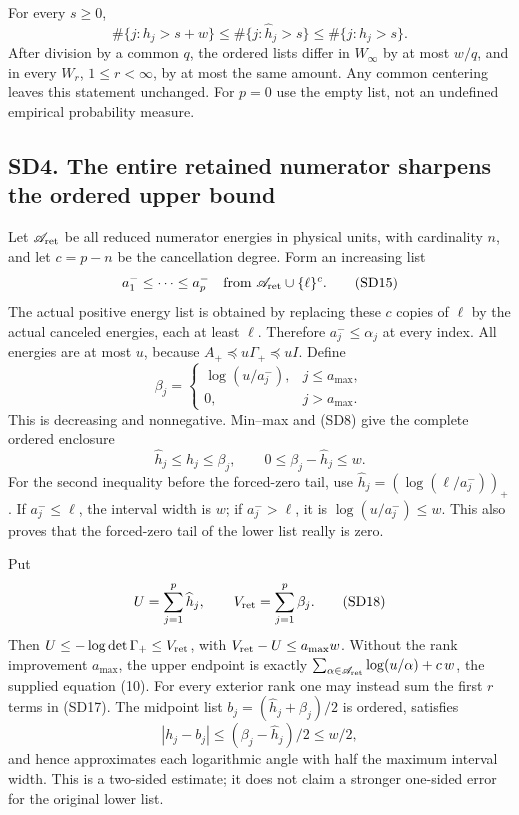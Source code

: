 \documentclass[11pt]{article}
\begin{document}
For every \(s\ge0\), \[
\#\{j:h_j>s+w\}\le\#\{j:\widehat h_j>s\}
\le\#\{j:h_j>s\}.
\tag{SD14}
\] After division by a common \(q\), the ordered lists differ in \(W_\infty\) by at most \(w/q\), and in every \(W_r\), \(1\le r<\infty\), by at most the same amount. Any common centering leaves this statement unchanged. For \(p=0\) use the empty list, not an undefined empirical probability measure.

\subsection{SD4. The entire retained numerator sharpens the ordered upper bound}\label{sd4.-the-entire-retained-numerator-sharpens-the-ordered-upper-bound}

Let \(\mathscr A_{\rm ret}\) be all reduced numerator energies in physical units, with cardinality \(n\), and let \(c=p-n\) be the cancellation degree. Form an increasing list \[
a_1^-\le\cdots\le a_p^-
\quad\text{from }\mathscr A_{\rm ret}\cup\{\ell\}^{c}.
\tag{SD15}
\] The actual positive energy list is obtained by replacing these \(c\) copies of \(\ell\) by the actual canceled energies, each at least \(\ell\). Therefore \(a_j^-\le\alpha_j\) at every index. All energies are at most \(u\), because \(A_+\preceq u\Gamma_+\preceq uI\). Define \[
\beta_j=\begin{cases}\log(u/a_j^-),&j\le a_{\max},\\0,&j>a_{\max}.\end{cases}
\tag{SD16}
\] This is decreasing and nonnegative. Min--max and (SD8) give the complete ordered enclosure \[
\widehat h_j\le h_j\le\beta_j,\qquad
0\le\beta_j-\widehat h_j\le w.
\tag{SD17}
\] For the second inequality before the forced-zero tail, use \(\widehat h_j=(\log(\ell/a_j^-))_+\). If \(a_j^-\le\ell\), the interval width is \(w\); if \(a_j^->\ell\), it is \(\log(u/a_j^-)\le w\). This also proves that the forced-zero tail of the lower list really is zero.

Put \[
U=\sum_{j=1}^{p}\widehat h_j,\qquad V_{\rm ret}=\sum_{j=1}^{p}\beta_j.
\tag{SD18}
\] Then \(U\le-\log\det\Gamma_+\le V_{\rm ret}\), with \(V_{\rm ret}-U\le a_{\max}w\). Without the rank improvement \(a_{\max}\), the upper endpoint is exactly \(\sum_{\alpha\in\mathscr A_{\rm ret}}\log(u/\alpha)+c\,w\), the supplied equation (10). For every exterior rank one may instead sum the first \(r\) terms in (SD17). The midpoint list \(b_j=(\widehat h_j+\beta_j)/2\) is ordered, satisfies \[
|h_j-b_j|\le(\beta_j-\widehat h_j)/2\le w/2,
\tag{SD19}
\] and hence approximates each logarithmic angle with half the maximum interval width. This is a two-sided estimate; it does not claim a stronger one-sided error for the original lower list.
\end{document}
